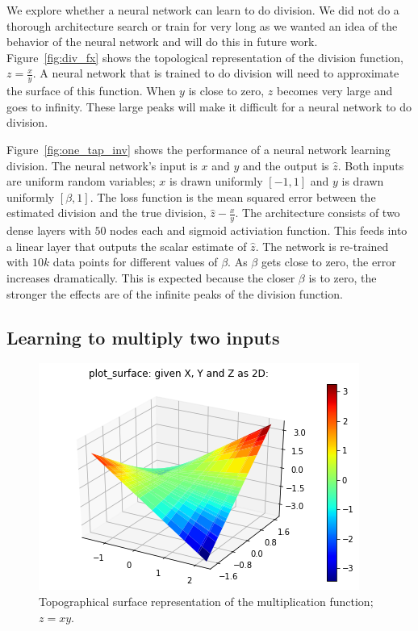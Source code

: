 We explore whether a neural network can learn to do division.  We did not do a thorough architecture search or train for very long as we wanted an idea of the behavior of the neural network and will do this in future work.  
Figure~\ref{fig:div_fx} shows the topological representation of the division function, $z=\frac{x}{y}$.  A neural network that is trained to do division will need to approximate the surface of this function.  
When $y$ is close to zero, $z$ becomes very large and goes to infinity.  These large peaks will make it difficult for a neural network to do division.  

Figure~\ref{fig:one_tap_inv} shows the performance of a neural network learning division.
The neural network's input is $x$ and $y$ and the output is $\hat{z}$.  Both inputs are uniform random variables; $x$ is drawn uniformly $[-1,1]$ and $y$ is drawn uniformly $[\beta,1]$. 
The loss function is the mean squared error between the estimated division and the true division, $\hat{z}-\frac{x}{y}$.
The architecture consists of two dense layers with $50$ nodes each and sigmoid activiation function.  This feeds into a linear layer that outputs the scalar estimate of $\hat{z}$.  
The network is re-trained with $10k$ data points for different values of $\beta$. As $\beta$ gets close to zero, the error increases dramatically.  This is expected because the closer $\beta$ is to zero, the stronger the effects are of the infinite peaks of the division function.

\subsection{Learning to multiply two inputs}

\begin{figure}
\begin{center}
\includegraphics{figures/equal/Multiplication_Function_plot.png}
\caption{Topographical surface representation of the multiplication function; $z=xy$.}
\label{fig:mult_fx}
\end{center}
\end{figure}

